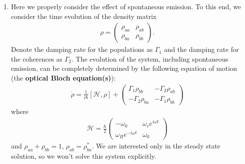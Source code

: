\documentclass{article}
\theoremstyle{definition}
\newcommand{\ham}{\mathcal{H}}
\newcommand{\f}[2]{\frac{#1}{#2}}
\begin{document}
\begin{enumerate}[label=(\alph*)]
	\item Here we properly consider the effect of spontaneous emission. To this end, we consider the time evolution of the density matrix 
	\begin{align*}
	\rho = \begin{pmatrix}
	\rho_{aa} & \rho_{ab} \\ \rho_{ba} & \rho_{bb}
 	\end{pmatrix}.
	\end{align*}
	Denote the damping rate for the populations as $\Gamma_1$ and the damping rate for the coherences as $\Gamma_2$. The evolution of the system, including spontaneous emission, can be completely determined by the following equation of motion (the \textbf{optical Bloch equation(s)}):
	\begin{align*}
	\dot\rho = \f{1}{i\hbar}[\ham, \rho] + \begin{pmatrix}
	\Gamma_1 \rho_{bb} & -\Gamma_2 \rho_{ab} \\ -\Gamma_2 \rho_{ba} & -\Gamma_1 \rho_{bb}
	\end{pmatrix}
	\end{align*}
	where 
	\begin{align*}
	\ham = \f{\hbar}{2}\begin{pmatrix}
	-\omega_0 & \omega_r e^{i\omega t} \\ \omega_R e^{-i \omega t} & \omega_0
	\end{pmatrix}
	\end{align*}
	and $\rho_{aa} + \rho_{bb} =1$, $\rho_{ab} = \rho^*_{ba}$. We are interested only in the steady state solution, so we won't solve this system explicitly. 
	

\end{enumerate}
\end{document}
